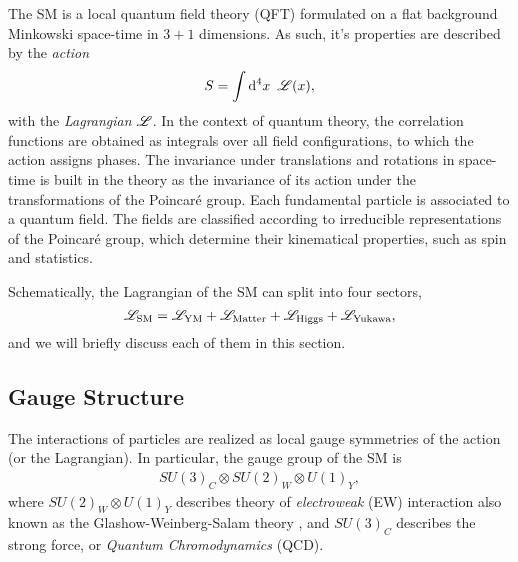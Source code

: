 The SM is a local quantum field theory (QFT) formulated on a flat background Minkowski space-time in $3+1$ dimensions.
As such, it's properties are described by the \emph{action}
\[
  S = \int \dd[4]{x}~{\mathscr{L}}(x),
\]
with the \emph{Lagrangian} ${\mathscr{L}}$. 
In the context of quantum theory, the correlation functions
are obtained as integrals over all field configurations, to which the action assigns phases.
The invariance under translations and rotations in space-time is built in the theory as the
invariance of its action under the transformations of the Poincaré group.
Each fundamental particle is associated to a quantum field.
The fields are classified according to irreducible representations of the Poincaré group,
which determine their kinematical properties, such as spin and statistics.


Schematically, the Lagrangian of the SM can split into four sectors,
\begin{equation}
  {\mathscr{L}}_{\text{SM}} = {\mathscr{L}}_{\text{YM}} + {\mathscr{L}}_{\text{Matter}} + {\mathscr{L}}_{\text{Higgs}} + {\mathscr{L}}_{\text{Yukawa}},
\end{equation}
and we will briefly discuss each of them in this section.

\subsection{Gauge Structure}
\label{sec:giym}

The interactions of particles are realized as local gauge symmetries of the action (or the Lagrangian).
In particular, the gauge group of the SM is
\begin{align}\label{eq:SMgauge}
  SU(3)_C\otimes SU(2)_W \otimes U(1)_Y,
\end{align}
where $SU(2)_W \otimes U(1)_Y$ describes theory of \emph{electroweak} (EW)
interaction also known as the Glashow-Weinberg-Salam theory \cite{Glashow1961a,Weinberg1967a,Salam1968,Glashow1970},
and $SU(3)_C$ describes the strong force, or \emph{Quantum Chromodynamics} (QCD).

